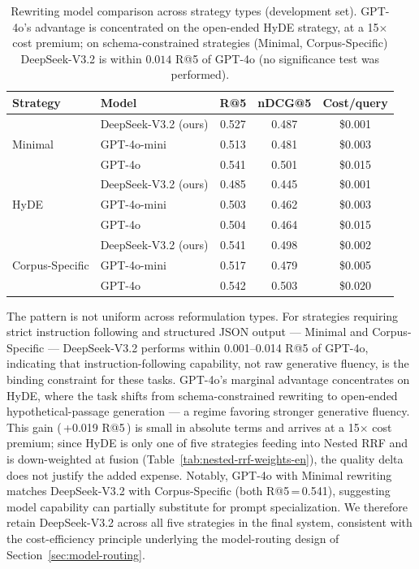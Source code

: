 \begin{table}[h]
\centering
\begin{tabular}{llccc}
\toprule
\textbf{Strategy} & \textbf{Model} & \textbf{R@5} & \textbf{nDCG@5} & \textbf{Cost/query} \\
\midrule
\multirow{3}{*}{Minimal}
 & DeepSeek-V3.2 (ours) & 0.527 & 0.487 & \$0.001 \\
 & GPT-4o-mini           & 0.513 & 0.481 & \$0.003 \\
 & GPT-4o                & 0.541 & 0.501 & \$0.015 \\
\midrule
\multirow{3}{*}{HyDE}
 & DeepSeek-V3.2 (ours) & 0.485 & 0.445 & \$0.001 \\
 & GPT-4o-mini           & 0.503 & 0.462 & \$0.003 \\
 & GPT-4o                & 0.504 & 0.464 & \$0.015 \\
\midrule
\multirow{3}{*}{Corpus-Specific}
 & DeepSeek-V3.2 (ours) & 0.541 & 0.498 & \$0.002 \\
 & GPT-4o-mini           & 0.517 & 0.479 & \$0.005 \\
 & GPT-4o                & 0.542 & 0.503 & \$0.020 \\
\bottomrule
\end{tabular}
\caption{Rewriting model comparison across strategy types (development set). GPT-4o's advantage
is concentrated on the open-ended HyDE strategy, at a 15$\times$ cost premium; on schema-constrained
strategies (Minimal, Corpus-Specific) DeepSeek-V3.2 is within $0.014$ R@5 of GPT-4o (no significance test was performed).}
\label{tab:rewriting-model-selection}
\end{table}

The pattern is not uniform across reformulation types. For strategies requiring strict instruction
following and structured JSON output — Minimal and Corpus-Specific — DeepSeek-V3.2 performs within
0.001--0.014 R@5 of GPT-4o, indicating that instruction-following capability, not raw generative
fluency, is the binding constraint for these tasks. GPT-4o's marginal advantage concentrates on
HyDE, where the task shifts from schema-constrained rewriting to open-ended hypothetical-passage
generation — a regime favoring stronger generative fluency. This gain (\,+0.019 R@5\,) is small in
absolute terms and arrives at a 15$\times$ cost premium; since HyDE is only one of five strategies
feeding into Nested RRF and is down-weighted at fusion (Table~\ref{tab:nested-rrf-weights-en}), the
quality delta does not justify the added expense. Notably, GPT-4o with Minimal rewriting matches
DeepSeek-V3.2 with Corpus-Specific (both R@5\,=\,0.541), suggesting model capability can partially
substitute for prompt specialization. We therefore retain DeepSeek-V3.2 across all five strategies
in the final system, consistent with the cost-efficiency principle underlying the model-routing
design of Section~\ref{sec:model-routing}.
